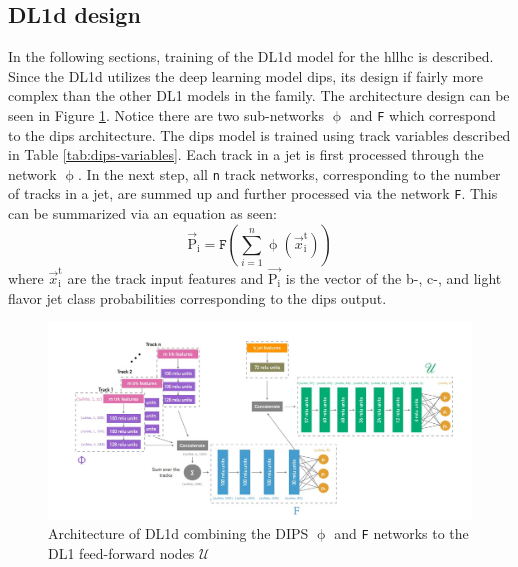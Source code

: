 \subsection{DL1d design}

In the following sections, training of the DL1d model for the \gls{hllhc} is described. Since the DL1d utilizes the deep learning model \gls{dips}, its design if fairly more complex than the 
other DL1 models in the family. The architecture design can be seen in Figure \ref{fig:dl1d-design}. Notice there are two sub-networks $\upphi$ and \texttt{F} which correspond to the \gls{dips} architecture. The 
\gls{dips} model is trained using track variables described in Table \ref{tab:dips-variables}. Each track in a jet is first processed through the network $\upphi$. In the next step, all \texttt{n}
track networks, corresponding to the number of tracks in a jet, are summed up and further processed via the network \texttt{F}. This can be summarized via an equation as seen:
%
\begin{equation}\label{eq:5.3}
    \overrightarrow{\textrm{P}}_{\textrm{i}} = \texttt{F}\left(\sum_{i=1}^{n}\upphi({\overrightarrow{x}_{\textrm{i}}^{\textrm{t}}})\right)
\tag{5.3}
\end{equation}
%
where $\overrightarrow{x}_{\textrm{i}}^{\textrm{t}}$ are the track input features and $\overrightarrow{\textrm{P}_{\textrm{i}}}$ is the vector of the b-, c-, and light flavor jet class probabilities
corresponding to the \gls{dips} output.

\begin{figure}[h]
    \centering
    \includegraphics[scale=0.5]{figs/ch5/dl1d-design.jpg}
    \caption{ Architecture of DL1d combining the DIPS $\upphi$ and \texttt{F} networks to the DL1 feed-forward nodes \textit{$\mathscr{U}$} }
\label{fig:dl1d-design}
\end{figure}

